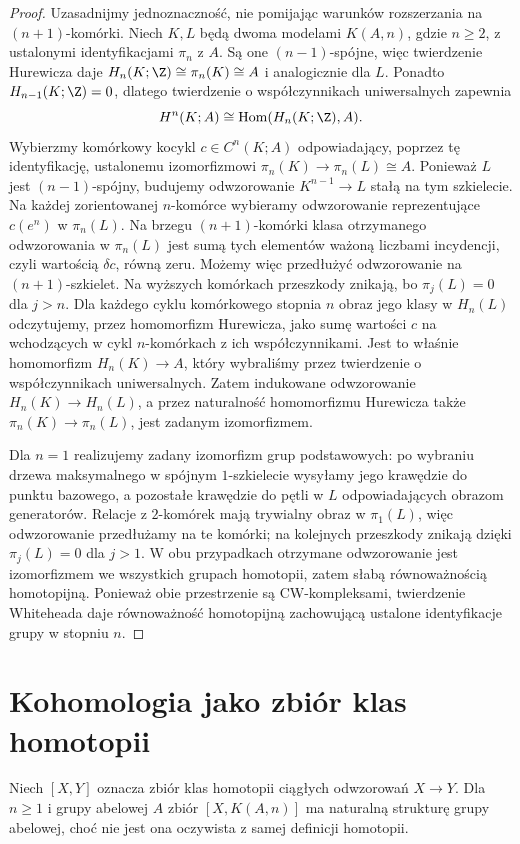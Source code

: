 \begin{proof}
Uzasadnijmy jednoznaczność, nie pomijając warunków
rozszerzania na $(n+1)$-komórki. Niech $K,L$ będą dwoma
modelami $K(A,n)$, gdzie $n\ge2$, z ustalonymi
identyfikacjami $\pi_n$ z $A$. Są one $(n-1)$-spójne,
więc twierdzenie Hurewicza daje
$H_n(K;\Z)\cong\pi_n(K)\cong A$ i analogicznie dla $L$.
Ponadto $H_{n-1}(K;\Z)=0$, dlatego twierdzenie
o współczynnikach uniwersalnych zapewnia
\[
 H^n(K;A)\cong\operatorname{Hom}(H_n(K;\Z),A).
\]
Wybierzmy komórkowy kocykl $c\in C^n(K;A)$
odpowiadający, poprzez tę identyfikację, ustalonemu
izomorfizmowi $\pi_n(K)\to\pi_n(L)\cong A$.
Ponieważ $L$ jest $(n-1)$-spójny, budujemy odwzorowanie
$K^{n-1}\to L$ stałą na tym szkielecie.
Na każdej zorientowanej $n$-komórce wybieramy
odwzorowanie reprezentujące $c(e^n)$ w $\pi_n(L)$.
Na brzegu $(n+1)$-komórki klasa otrzymanego odwzorowania
w $\pi_n(L)$ jest sumą tych elementów ważoną
liczbami incydencji, czyli wartością $\delta c$,
równą zeru. Możemy więc przedłużyć odwzorowanie na
$(n+1)$-szkielet. Na wyższych komórkach przeszkody
znikają, bo $\pi_j(L)=0$ dla $j>n$.
Dla każdego cyklu komórkowego stopnia $n$
obraz jego klasy w $H_n(L)$ odczytujemy, przez
homomorfizm Hurewicza, jako sumę wartości $c$
na wchodzących w cykl $n$-komórkach z ich
współczynnikami. Jest to właśnie homomorfizm
$H_n(K)\to A$, który wybraliśmy przez twierdzenie
o współczynnikach uniwersalnych. Zatem indukowane
odwzorowanie $H_n(K)\to H_n(L)$, a przez
naturalność homomorfizmu Hurewicza także
$\pi_n(K)\to\pi_n(L)$, jest zadanym izomorfizmem.

Dla $n=1$ realizujemy zadany izomorfizm grup podstawowych:
po wybraniu drzewa maksymalnego w spójnym $1$-szkielecie
wysyłamy jego krawędzie do punktu bazowego, a pozostałe
krawędzie do pętli w $L$ odpowiadających obrazom generatorów.
Relacje z $2$-komórek mają trywialny obraz w $\pi_1(L)$,
więc odwzorowanie przedłużamy na te komórki; na kolejnych
przeszkody znikają dzięki $\pi_j(L)=0$ dla $j>1$.
W obu przypadkach otrzymane odwzorowanie jest izomorfizmem
we wszystkich grupach homotopii, zatem słabą
równoważnością homotopijną. Ponieważ obie przestrzenie
są CW-kompleksami, twierdzenie Whiteheada daje
równoważność homotopijną zachowującą ustalone
identyfikacje grupy w stopniu $n$.
\end{proof}

\section{Kohomologia jako zbiór klas homotopii}
Niech $[X,Y]$ oznacza zbiór klas homotopii ciągłych
odwzorowań $X\to Y$. Dla $n\ge1$ i grupy abelowej $A$
zbiór $[X,K(A,n)]$ ma naturalną strukturę grupy abelowej,
choć nie jest ona oczywista z samej definicji homotopii.

